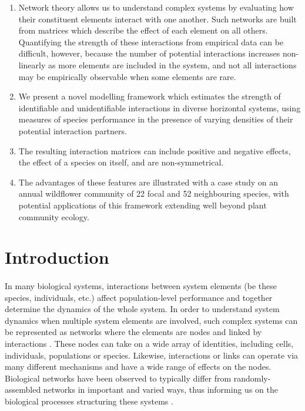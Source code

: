 \documentclass[a4,12pt]{article}
\begin{document}
    \begin{enumerate}
    \item{Network theory allows us to understand complex systems by evaluating how their constituent elements interact with one another. Such networks are built from matrices which describe the effect of each element on all others. Quantifying the strength of these interactions from empirical data can be difficult, however, because the number of potential interactions increases non-linearly as more elements are included in the system, and not all interactions may be empirically observable when some elements are rare.}
    \item{We present a novel modelling framework which estimates the strength of identifiable and unidentifiable interactions in diverse horizontal systems, using measures of species performance in the presence of varying densities of their potential interaction partners.}
    \item{The resulting interaction matrices can include positive and negative effects, the effect of a species on itself, and are non-symmetrical.} 
    \item{The advantages of these features are illustrated with a case study on an annual wildflower community of 22 focal and 52 neighbouring species, with potential applications of this framework extending well beyond plant community ecology.}
\end{enumerate}

\section{Introduction}

    
    \paragraph{}
    In many biological systems, interactions between system elements (be these species, individuals, etc.) affect population-level performance and together determine the dynamics of the whole system. In order to understand system dynamics when multiple system elements are involved, such complex systems can be represented as networks where the elements are nodes and linked by interactions \parencite{Pimm1978}. These nodes can take on a wide array of identities, including cells, individuals, populations or species. Likewise, interactions or links can operate via many different mechanisms and have a wide range of effects on the nodes. Biological networks have been observed to typically differ from randomly-assembled networks in important and varied ways, thus informing us on the biological processes structuring these systems \parencite{Dunne2002, Kinlock2019}.
\end{document}
